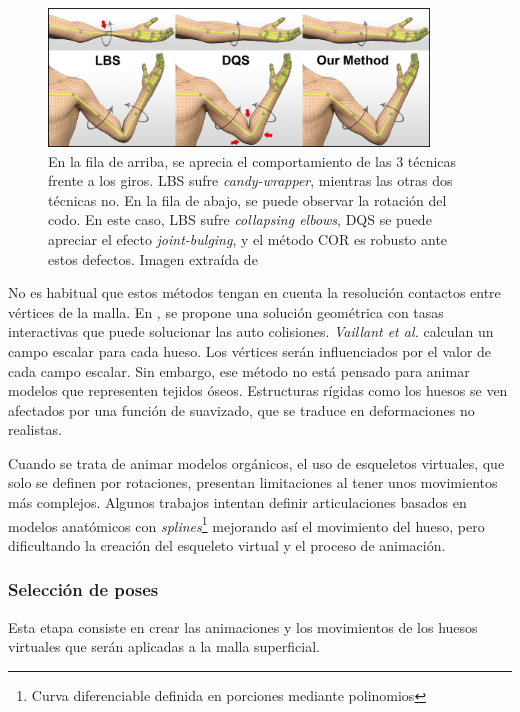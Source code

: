\begin{figure}[h]%
  \centering
  \includegraphics[width=0.90\textwidth]{IMG/corexample.png}
    \caption{En la fila de arriba, se aprecia el comportamiento de las 3 técnicas frente a los giros. \ac{LBS} sufre \emph{candy-wrapper}, mientras las otras dos técnicas no. En la fila de abajo, se puede observar la rotación del codo. En este caso, \ac{LBS} sufre \emph{collapsing elbows}, \ac{DQS} se puede apreciar el efecto \emph{joint-bulging}, y el método \acs{COR} es robusto ante estos defectos. Imagen extraída de \cite{le2016real} }
    \label{fig:corexample}
\end{figure}
%
%
No es habitual que estos métodos tengan en cuenta la resolución contactos entre vértices de la malla. En \cite{Vaillant:2014}, se propone una solución geométrica con tasas interactivas que puede solucionar las auto colisiones. \emph{Vaillant et al.} calculan un campo escalar para cada hueso. Los vértices serán influenciados por el valor de cada campo escalar. Sin embargo, ese método no está pensado para animar modelos que representen tejidos óseos. Estructuras rígidas como los huesos se ven afectados por una función de suavizado, que se traduce en deformaciones no realistas. %

Cuando se trata de animar modelos orgánicos, el uso de esqueletos virtuales, que solo se definen por rotaciones, presentan limitaciones al tener unos movimientos más complejos. Algunos trabajos intentan definir articulaciones basados en modelos anatómicos \cite{joints} con \emph{splines}\footnote{Curva diferenciable definida en porciones mediante polinomios} mejorando así el movimiento del hueso, pero dificultando la creación del esqueleto virtual y el proceso de animación.

\subsubsection{Selección de poses} 
\label{art:poses}
Esta etapa consiste en crear las animaciones  y los movimientos de los huesos virtuales que serán aplicadas a la malla superficial.   

